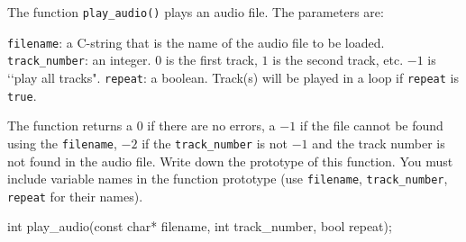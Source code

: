 \nextq
The function \verb!play_audio()! plays an audio file.
The parameters are:
\begin{enumerate}[nosep]
\li \verb!filename!: a C-string that is the name of the audio file to be loaded.
\li \verb!track_number!: an integer.
$0$ is the first track, $1$ is the second track, etc.
$-1$ is \lq\lq play all tracks".
\li \verb!repeat!: a boolean.
Track(s) will be played in a loop if \verb!repeat!
is \verb!true!.
\end{enumerate}
The function returns a $0$ if there are no errors,
a $-1$ if the file cannot be found using the \verb!filename!,
$-2$ if the \verb!track_number! is not $-1$ and the track number is not found
in the audio file.
Write down the prototype of this function.
You must include variable names in the function prototype
(use \verb!filename!, \verb!track_number!, \verb!repeat! for their names).
\\
\ANSWER
\begin{answercode}
int play_audio(const char* filename, int track_number, bool repeat);
\end{answercode}


